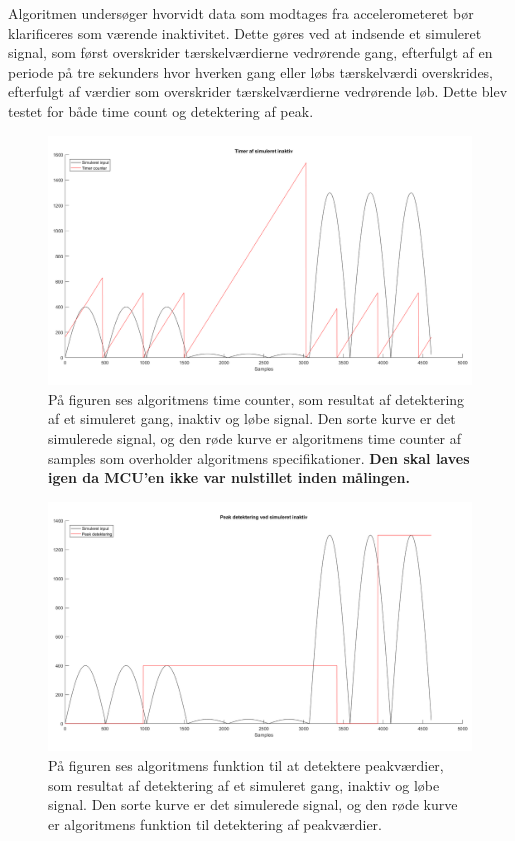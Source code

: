 Algoritmen undersøger hvorvidt data som modtages fra accelerometeret bør klarificeres som værende inaktivitet. Dette gøres ved at indsende et simuleret signal, som først overskrider tærskelværdierne vedrørende gang, efterfulgt af en periode på tre sekunders hvor hverken gang eller løbs tærskelværdi overskrides, efterfulgt af værdier som overskrider tærskelværdierne vedrørende løb. Dette blev testet for både time count og detektering af peak. 
\begin{figure}[H]
	\centering
	\includegraphics[scale=0.3]{figures/cDesign/test_timecount_inaktiv.png}
	\caption{På figuren ses algoritmens time counter, som resultat af detektering af et simuleret gang, inaktiv og løbe signal. Den sorte kurve er det simulerede signal, og den røde kurve er algoritmens time counter af samples som overholder algoritmens specifikationer. \textbf{Den skal laves igen da MCU'en ikke var nulstillet inden målingen.}}
	\label{fig:test_inaktiv_time}
\end{figure}
\begin{figure}[H]
	\centering
	\includegraphics[scale=0.3]{figures/cDesign/test_peak_inaktiv.png}
	\caption{På figuren ses algoritmens funktion til at detektere peakværdier, som resultat af detektering af et simuleret gang, inaktiv og løbe signal. Den sorte kurve er det simulerede signal, og den røde kurve er algoritmens funktion til detektering af peakværdier. }
	\label{fig:test_inaktiv_peak}
\end{figure}
